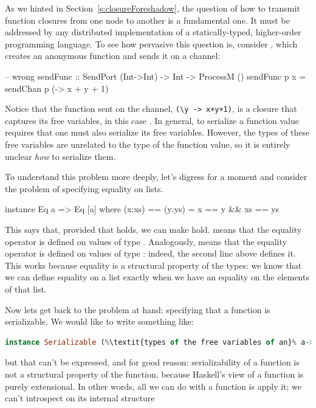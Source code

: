\documentclass[preprint]{sigplanconf}
\begin{document}
\noindent
As we hinted in Section~\ref{s:closureForeshadow}, 
the question of how to transmit function closures from one node to another is a fundamental one.  
It must be addressed by any distributed implementation of a statically-typed, 
higher-order programming language.  
To see how pervasive this question is, consider , which creates an anonymous function and sends it on a channel:
\begin{code}
-- wrong
sendFunc :: SendPort (Int->Int) -> Int -> ProcessM ()
sendFunc p x = sendChan p (\y -> x + y + 1)
\end{code}
Notice that the function sent on the channel, \lstinline!(\y -> x+y+1)!,
is a closure that captures its free variables,
in this case . 
In general, to serialize a function value requires that one must also serialize its free variables.
However, the types of
these free variables are unrelated to the type of the function
value, so it is entirely unclear \emph{how} to serialize them.

To understand this problem more deeply, let's digress for a moment and consider the problem of specifying equality on lists.
\begin{code}
  instance Eq a => Eq [a] where
  	(x:xs) == (y:ys) = x == y && xs == ys
\end{code}
This says that, provided that  holds, we can make  hold.
 means that the equality operator \textt{==} is defined on values of type .  Analogously,  means that the equality operator is defined on values of type \textt{[a]}: indeed, the second line above defines it.
This works because equality is a structural property of the types: we know that we can define equality on a list exactly when we have an equality on the elements of that list.

Now lets get back to the problem at hand: specifying that a function is serializable.
We would like to write something like:
\begin{lstlisting}[language=Haskell,
			escapechar={\%},
			stringstyle=\ttfamily]
  instance Serializable (%\textit{types of the free variables of an}% a->b) => Serializable (a->b) where ...
\end{lstlisting}
but that can't be expressed, and for good reason:  serializability of a function is not a structural property of the function, because Haskell's view of a function is purely extensional.  
In other words, all we can do with a function is apply it; we can't introspect on its internal structure
\end{document}

